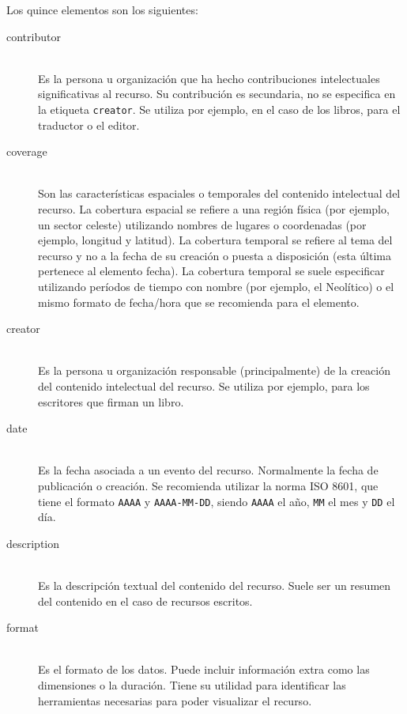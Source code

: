 \documentclass[../main.tex]{subfiles}
\begin{document}
Los quince elementos son los siguientes:

\begin{description}

  \item[contributor] \mbox{}\\ Es la persona u organización que ha hecho contribuciones intelectuales significativas al recurso. Su contribución es secundaria, no se especifica en la etiqueta \texttt{creator}. Se utiliza por ejemplo, en el caso de los libros, para el traductor o el editor.

  \item[coverage] \mbox{}\\ Son las características espaciales o temporales del contenido intelectual del recurso. La cobertura espacial se refiere a una región física (por ejemplo, un sector celeste) utilizando nombres de lugares o coordenadas (por ejemplo, longitud y latitud). La cobertura temporal se refiere al tema del recurso y no a la fecha de su creación o puesta a disposición (esta última pertenece al elemento fecha). La cobertura temporal se suele especificar utilizando períodos de tiempo con nombre (por ejemplo, el Neolítico) o el mismo formato de fecha/hora que se recomienda para el elemento.

  \item[creator] \mbox{}\\ Es la persona u organización responsable (principalmente) de la creación del contenido intelectual del recurso. Se utiliza por ejemplo, para los escritores que firman un libro.

  \item[date] \mbox{}\\ Es la fecha asociada a un evento del recurso. Normalmente la fecha de publicación o creación. Se recomienda utilizar la norma ISO 8601, que tiene el formato \texttt{AAAA} y \texttt{AAAA-MM-DD}, siendo \texttt{AAAA} el año, \texttt{MM} el mes y \texttt{DD} el día.

  \item[description] \mbox{}\\ Es la descripción textual del contenido del recurso. Suele ser un resumen del contenido en el caso de recursos escritos.

  \item[format] \mbox{}\\ Es el formato de los datos. Puede incluir información extra como las dimensiones o la duración. Tiene su utilidad para identificar las herramientas necesarias para poder visualizar el recurso.


\end{description}
\end{document}
